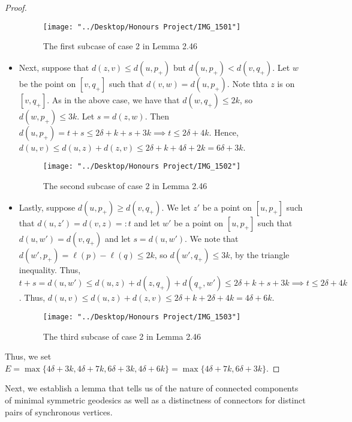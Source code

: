\documentclass[12pt]{article}
\newcommand{\vs}{\vskip10pt}
\begin{document}
\begin{proof}
\begin{itemize}
\begin{figure}[H]
	\centering
	\texttt{[image: "../Desktop/Honours Project/IMG\_1501"]}
	\caption{The first subcase of case 2 in Lemma 2.46}
	\label{fig:img1501}
\end{figure}
			\item Next, suppose that $d(z, v) \leq d(u, p_{+})$ but $d(u, p_{+}) < d(v, q_{+})$. Let $w$ be the point on $[v, q_{+}]$ such that $d(v, w) = d(u, p_{+})$. Note thta $z$ is on $[v, q_{+}]$. As in the above case, we have that $d(w, q_{+}) \leq 2k$, so $d(w, p_{+}) \leq 3k$. Let $s = d(z, w)$. Then $d(u, p_{+}) = t + s \leq 2\delta + k + s + 3k \implies t \leq 2 \delta + 4k$. Hence, $d(u,v) \leq d(u,z) + d(z,v) \leq 2 \delta + k + 4 \delta + 2k = 6 \delta + 3k$. 
			
\begin{figure} [H]
	\centering
	\texttt{[image: "../Desktop/Honours Project/IMG\_1502"]}
	\caption{The second subcase of case 2 in Lemma 2.46}
	\label{fig:img1502}
\end{figure}

			\item Lastly, suppose $d(u, p_{+}) \geq d(v, q_{+})$. We let $z'$ be a point on $[u, p_{+}]$ such that $d(u, z') = d(v,z) =:t$ and let $w'$ be a point on $[u, p_{+}]$ such that $d(u, w') = d(v, q_{+})$ and let $s = d(u, w')$. We note that $d(w', p_{+}) = \ell(p) - \ell(q) \leq 2k$, so $d(w', q_{+}) \leq 3k$, by the triangle inequality. Thus, $t + s = d(u, w') \leq d(u, z) + d(z, q_{+}) + d(q_{+}, w') \leq 2\delta + k + s + 3k \implies t \leq 2 \delta + 4k$. Thus, $d(u,v) \leq d(u,z) + d(z, v) \leq 2 \delta + k + 2 \delta + 4k = 4 \delta + 6k$.  
			
\begin{figure} [H]
	\centering
	\texttt{[image: "../Desktop/Honours Project/IMG\_1503"]}
	\caption{The third subcase of case 2 in Lemma 2.46}
	\label{fig:img1503}
\end{figure}
		\end{itemize}
	
		Thus, we set $E = \max \{4 \delta + 3k, 4 \delta + 7k, 6 \delta + 3k, 4 \delta + 6k\} = \max \{4 \delta + 7k, 6 \delta + 3k\}$. 
		
	\end{proof}

	\vs 
	
	Next, we establish a lemma that tells us of the nature of connected components of minimal symmetric geodesics as well as a distinctness of connectors for distinct pairs of synchronous vertices. 
	
\end{document}
